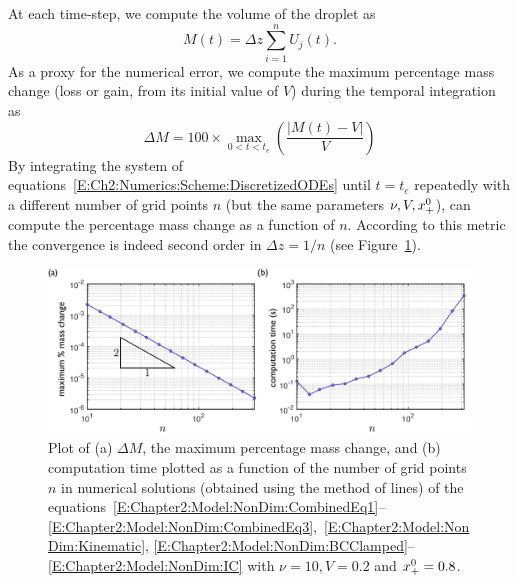 At each time-step, we compute the volume of the droplet as
\begin{equation}
M(t) = \Delta z\sum_{i = 1}^n U_j(t).
\end{equation}
As a proxy for the numerical error, we compute the maximum percentage mass change (loss or gain, from its initial value of $V$) during the temporal integration as
\begin{equation}
\Delta M = 100 \times \max_{0 < t < t_e} \left(\frac{|M(t)- V|}{V}\right)
\end{equation}
By integrating the system of equations~\eqref{E:Ch2:Numerics:Scheme:DiscretizedODEs} until $t = t_e$ repeatedly with a different number of grid points $n$ (but the same parameters $\nu, V, x_{+}^0$),
can compute the percentage mass change as a function of $n$. According to this metric the convergence is indeed second order in $\Delta z = 1/n$ (see Figure~\ref{fig:Ch2:Numerics:Scheme:SpeedTests}).
\begin{figure}[t]
\centering
\includegraphics[width = \textwidth]{SpeedTests}
\caption{Plot of (a) $\Delta M$, the maximum percentage mass change, and (b) computation time plotted as a function of the number of grid points $n$ in numerical solutions (obtained using the method of lines) of the equations~\eqref{E:Chapter2:Model:NonDim:CombinedEq1}--\eqref{E:Chapter2:Model:NonDim:CombinedEq3},~\eqref{E:Chapter2:Model:NonDim:Kinematic}, \eqref{E:Chapter2:Model:NonDim:BCClamped}--\eqref{E:Chapter2:Model:NonDim:IC}  with $\nu = 10, V = 0.2 $ and $x_{+}^0 = 0.8$.}\label{fig:Ch2:Numerics:Scheme:SpeedTests}
\end{figure}


